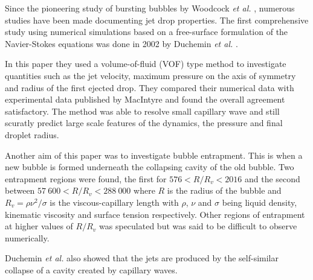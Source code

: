 Since the pioneering study of bursting bubbles by Woodcock \textit{et al.} \cite{woodcock1953giant}, numerous studies have been made documenting jet drop properties. The first comprehensive study using numerical simulations based on a free-surface formulation of the Navier-Stokes equations was done in 2002 by Duchemin \textit{et al.} \cite{duchemin2002jet
}.

In this paper they used a volume-of-fluid (VOF) type method to investigate quantities such as the jet velocity, maximum pressure on the axis of symmetry and radius of the first ejected drop. They compared their numerical data with experimental data published by MacIntyre \cite{macintyre1972flow} and found the overall agreement satisfactory. The method was able to resolve small capillary wave and still scuratly predict large scale features of the dynamics, the pressure and final droplet radius.

Another aim of this paper was to investigate bubble entrapment. This is when a new bubble is formed underneath the collapsing cavity of the old bubble. Two entrapment regions were found, the first for $576<R/R_v<2016$ and the second between $57\:600<R/R_v<288\:000$ where $R$ is the radius of the bubble and $R_v=\rho\nu^2/\sigma$ is the viscous-capillary length with $\rho$, $\nu$ and $\sigma$ being liquid density, kinematic viscosity and surface tension respectively. Other regions of entrapment at higher values of $R/R_v$ was speculated but was said to be difficult to observe numerically.

Duchemin \textit{et al.} also showed that the jets are produced by the self-similar collapse of a cavity created by capillary waves.
